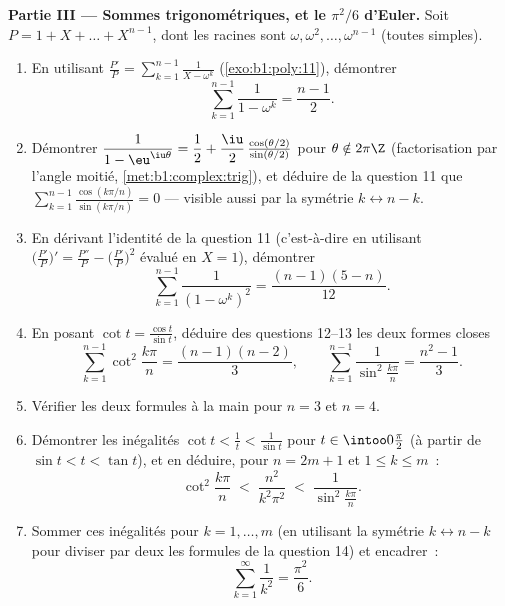 \begin{problem}
\medskip
\noindent\textbf{Partie III --- Sommes trigonométriques, et le
$\pi^2/6$ d'Euler.} Soit $P = 1 + X + \dots + X^{n-1}$, dont les racines
sont $\omega, \omega^2, \dots, \omega^{n-1}$ (toutes simples).
\begin{enumerate}[resume]
  \item En utilisant $\frac{P'}P = \sum_{k=1}^{n-1}\frac1{X - \omega^k}$
        (\cref{exo:b1:poly:11}), démontrer
        \[
        \sum_{k=1}^{n-1}\frac{1}{1 - \omega^k} = \frac{n-1}2 .
        \]
  \item Démontrer $\dfrac1{1 - \eu^{\iu\theta}} = \dfrac12 +
        \dfrac\iu2\,\frac{\cos(\theta/2)}{\sin(\theta/2)}$ pour
        $\theta \notin 2\pi\Z$ (factorisation par l'angle moitié,
        \cref{met:b1:complex:trig}), et déduire de la question 11
        que $\sum_{k=1}^{n-1}
        \frac{\cos(k\pi/n)}{\sin(k\pi/n)} = 0$ --- visible aussi
        par la symétrie $k \leftrightarrow n - k$.
  \item En dérivant l'identité de la question 11 (c'est-à-dire en
        utilisant $\bigl(\frac{P'}P\bigr)' = \frac{P''}P -
        \bigl(\frac{P'}P\bigr)^2$ évalué en $X = 1$), démontrer
        \[
        \sum_{k=1}^{n-1}\frac{1}{(1 - \omega^k)^2}
        = \frac{(n-1)(5-n)}{12} .
        \]
  \item En posant $\cot t = \frac{\cos t}{\sin t}$, déduire des
        questions 12--13 les deux formes closes
        \[
        \sum_{k=1}^{n-1}\cot^2\frac{k\pi}n = \frac{(n-1)(n-2)}3,
        \qquad
        \sum_{k=1}^{n-1}\frac1{\sin^2\frac{k\pi}n}
        = \frac{n^2-1}3 .
        \]
  \item Vérifier les deux formules à la main pour $n = 3$ et $n = 4$.
  \item Démontrer les inégalités $\cot t < \frac1t < \frac1{\sin t}$
        pour $t \in \intoo0{\frac\pi2}$ (à partir de $\sin t < t < \tan
        t$), et en déduire, pour $n = 2m + 1$ et $1 \leq k \leq m$~:
        \[
        \cot^2\frac{k\pi}n \;<\; \frac{n^2}{k^2\pi^2}
        \;<\; \frac1{\sin^2\frac{k\pi}n} .
        \]
  \item Sommer ces inégalités pour $k = 1, \dots, m$ (en utilisant la
        symétrie $k \leftrightarrow n - k$ pour diviser par deux les
        formules de la question 14) et encadrer~:
        \[
        \sum_{k=1}^{\infty}\frac1{k^2} = \frac{\pi^2}6 .
        \]
\end{enumerate}


\end{problem}
